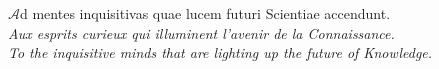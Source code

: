 \vspace*{\fill}

\epigraph{{\large $\mathcal{A}$d mentes inquisitivas quae lucem futuri Scientiae accendunt.}\\
{\footnotesize \textit{Aux esprits curieux qui illuminent l'avenir de la Connaissance.}}\\
{\footnotesize \textit{To the inquisitive minds that are lighting up the future of Knowledge.}}}{}

\vspace*{\fill}